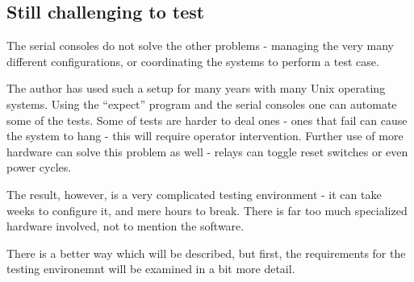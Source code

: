 \subsection{Still challenging to test}

The serial consoles do not solve the other problems - managing the very many 
different configurations, or coordinating the systems to perform a test case.

The author has used such a setup for many years with many Unix operating
systems. Using the ``expect'' program and the serial consoles one can
automate some of the tests. Some of tests are harder to deal ones - ones that 
fail can cause the system to hang - this will require operator
intervention. Further use of more hardware can solve this problem as well -
relays can toggle reset switches or even power cycles. 

The result, however, is a very complicated testing environment - it can take
weeks to configure it, and mere hours to break. There is far too much
specialized hardware involved, not to mention the software.

There is a better way which will be described, but first, the requirements
for the testing environemnt will be examined in a bit more detail.






	
